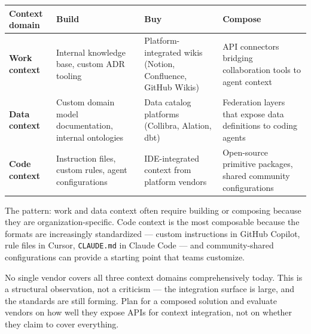\documentclass[
  a4paper,
  DIV=11,
  numbers=noendperiod]{scrreprt}
\newcounter{none} %
\begin{document}
{\def\LTcaptype{none} %
\begin{longtable}[]{@{}
  >{\raggedright\arraybackslash}p{}
  >{\raggedright\arraybackslash}p{}
  >{\raggedright\arraybackslash}p{}
  >{\raggedright\arraybackslash}p{}@{}}
\toprule\noalign{}
\begin{minipage}[b]{\linewidth}\raggedright
Context domain
\end{minipage} & \begin{minipage}[b]{\linewidth}\raggedright
Build
\end{minipage} & \begin{minipage}[b]{\linewidth}\raggedright
Buy
\end{minipage} & \begin{minipage}[b]{\linewidth}\raggedright
Compose
\end{minipage} \\
\midrule\noalign{}
\endhead
\bottomrule\noalign{}
\endlastfoot
\textbf{Work context} & Internal knowledge base, custom ADR tooling &
Platform-integrated wikis (Notion, Confluence, GitHub Wikis) & API
connectors bridging collaboration tools to agent context \\
\textbf{Data context} & Custom domain model documentation, internal
ontologies & Data catalog platforms (Collibra, Alation, dbt) &
Federation layers that expose data definitions to coding agents \\
\textbf{Code context} & Instruction files, custom rules, agent
configurations & IDE-integrated context from platform vendors &
Open-source primitive packages, shared community configurations \\
\end{longtable}
}

The pattern: work and data context often require building or composing
because they are organization-specific. Code context is the most
composable because the formats are increasingly standardized --- custom
instructions in GitHub Copilot, rule files in Cursor, \texttt{CLAUDE.md}
in Claude Code --- and community-shared configurations can provide a
starting point that teams customize.

No single vendor covers all three context domains comprehensively today.
This is a structural observation, not a criticism --- the integration
surface is large, and the standards are still forming. Plan for a
composed solution and evaluate vendors on how well they expose APIs for
context integration, not on whether they claim to cover everything.
\end{document}
